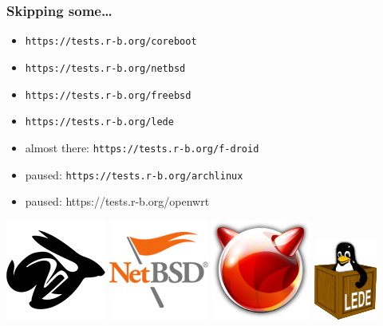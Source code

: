 \documentclass[14pt,aspectratio=169]{beamer}
\newif\ifplacelogo
\begin{document}
\placelogofalse

\begin{frame}
 \frametitle{Skipping some…}
 \begin{itemize}
  \item \texttt{https://tests.r-b.org/coreboot}
  \item \texttt{https://tests.r-b.org/netbsd}
  \item \texttt{https://tests.r-b.org/freebsd}
  \item \texttt{https://tests.r-b.org/lede}
  \item almost there: \texttt{https://tests.r-b.org/f-droid}
  \item paused: \texttt{https://tests.r-b.org/archlinux}
  \item paused: {https://tests.r-b.org/openwrt}
 \end{itemize}
 \begin{center}
  \includegraphics[height=0.13\paperheight]{images/coreboot.png}
  \hspace{0.05\paperwidth}
  \includegraphics[height=0.13\paperheight]{images/netbsd.png}
  \hspace{0.05\paperwidth}
  \includegraphics[height=0.13\paperheight]{images/freebsd.png}
  \hspace{0.05\paperwidth}
  \includegraphics[height=0.15\paperheight]{images/lede.png}

\end{center}
\end{frame}
\end{document}
